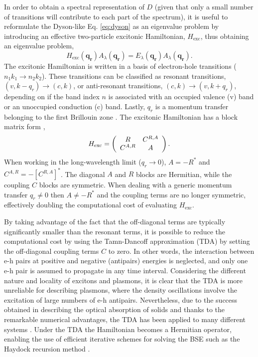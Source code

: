 \documentclass[aps,prb,10pt,showpacs,superscriptaddress,twocolumn,notitlepage]{revtex4-1}
\begin{document}
In order to obtain a spectral representation of $D$ (given that only a small
number of transitions will contribute to each part of the spectrum), it is
useful to reformulate the Dyson-like Eq. \eqref{eq:dyson} as an eigenvalue
problem \cite{rohlfingPRB00, onidaRMP02, zimmermannPSSB70, sottilethesis2003} by
introducing an effective two-particle excitonic Hamiltonian, $H_{\mathrm{exc}}$,
thus obtaining an eigenvalue problem,
\begin{equation*}
H_{\mathrm{exc}}(\mathbf{q_{r}}) A_{\lambda}(\mathbf{q_{r}}) =
E_{\lambda}(\mathbf{q_{r}})      A_{\lambda}(\mathbf{q_{r}}).
\end{equation*}
The excitonic Hamiltonian is written in a basis of electron-hole transitions
($n_{1}k_{1} \rightarrow n_{2}k_{2}$). These transitions can be classified as
resonant  transitions, $(v, k - q_{r}) \rightarrow (c, k)$, or anti-resonant
transitions, $(c, k) \rightarrow (v, k + q_{r})$, depending on if the band index
$n$ is associated with an occupied valence (v) band or an unoccupied conduction
(c) band. Lastly, $q_{r}$ is a momentum transfer belonging to the first
Brillouin zone \cite{gattiPRB13}. The excitonic Hamiltonian has a block matrix
form \cite{gattiPRB13, albrechtPRL98, olevanoPRL01, gruningCMS11},
\begin{equation*}
H_{\mathrm{exc}} =
\left(
\begin{array}{c c}
R       & C^{R,A} \\
C^{A,R} & A       \\
\end{array}
\right).
\end{equation*}
When working in the long-wavelength limit ($q_{r} \rightarrow 0$), $A = -R^{*}$
and $C^{A,R} = -\left[C^{R,A}\right]^{*}$. The diagonal $A$ and $R$ blocks are
Hermitian, while the coupling $C$ blocks are symmetric. When dealing with a
generic momentum transfer $q_{r} \neq 0$ then $A \neq -R^{*}$ and the coupling
terms are no longer symmetric, effectively doubling the computational cost of
evaluating $H_{\mathrm{exc}}$.

By taking advantage of the fact that the off-diagonal terms are typically
significantly smaller than the resonant terms, it is possible to reduce the
computational cost by using the Tamn-Dancoff approximation (TDA)
\cite{fetterbook72} by setting the off-diagonal coupling terms $C$ to zero. In
other words, the interaction between e-h pairs at positive and negative
(antipairs) energies is neglected, and only one e-h pair is assumed to propagate
in any time interval. Considering the different nature and locality of excitons
and plasmons, it is clear that the TDA is more unreliable for describing
plasmons, where the density oscillations involve the excitation of large numbers
of e-h antipairs. Nevertheless, due to the success obtained in describing the
optical absorption of solids and thanks to the remarkable numerical advantages,
the TDA has been applied to many different systems \cite{luciabook}. Under the
TDA the Hamiltonian becomes a Hermitian operator, enabling the use of efficient
iterative schemes for solving the BSE such as the Haydock recursion method
\cite{haydockJPC72, haydockCPC80, benedictPRB99, roccaJCP08, gruningCMS11,
ljungbergPRB15}.
\end{document}

